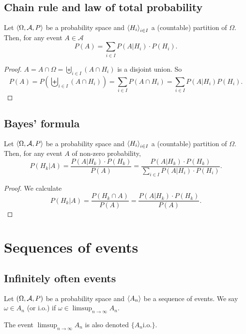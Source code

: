 \subsection{Chain rule and law of total probability}
\begin{theorem}
Let $\left\langle \Omega, \mathcal{A}, P \right\rangle$ be a probability space and $\left\langle H_i \right\rangle_{i\in I}$ a (countable) partition of $\Omega$. Then, for any event $A\in \mathcal{A}$
\[ P(A) = \sum_{i\in I}P(A|H_i)\cdot P(H_i). \]
\end{theorem}
\begin{proof}
$A = A\cap \Omega = \biguplus_{i\in I}(A\cap H_i)$ is a disjoint union. So
\[ P(A) = P\left(\biguplus_{i\in I}(A\cap H_i)\right) = \sum_{i\in I}P(A\cap H_i) = \sum_{i\in I}P(A|H_i)P(H_i). \]
\end{proof}

\subsection{Bayes' formula}
\begin{theorem}
Let $\left\langle \Omega, \mathcal{A}, P \right\rangle$ be a probability space and $\left\langle H_i \right\rangle_{i\in I}$ a (countable) partition of $\Omega$. Then, for any event $A$ of non-zero probability,
\[ P(H_k|A ) = \frac{P(A|H_k)\cdot P(H_k)}{P(A)} = \frac{P(A|H_k)\cdot P(H_k)}{\sum_{i\in I}P(A|H_i)\cdot P(H_i)}. \]
\end{theorem}
\begin{proof}
We calculate
\[ P(H_k|A) = \frac{P(H_k \cap A)}{P(A)} = \frac{P(A|H_k)\cdot P(H_k)}{P(A)}. \]
\end{proof}

\section{Sequences of events}
\subsection{Infinitely often events}
\begin{definition}
Let $\sSet{\Omega, \mathcal{A}, P}$ be a probability space and $\left\langle A_n \right\rangle$ be a sequence of events. We say $\omega \in A_n$  (or i.o.) if $\omega\in \limsup_{n\to\infty}A_n$.

The event $\limsup_{n\to\infty}A_n$ is also denoted $\{A_n \text{i.o.}\}$.
\end{definition}

